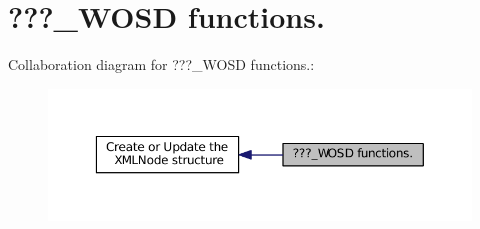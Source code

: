 \hypertarget{group__xmlWOSD}{\section{???\-\_\-\-W\-O\-S\-D functions.}
\label{group__xmlWOSD}
}
Collaboration diagram for ???\-\_\-\-W\-O\-S\-D functions.\-:
\nopagebreak
\begin{figure}[H]
\begin{center}
\leavevmode
\includegraphics[width=350pt]{group__xmlWOSD}
\end{center}
\end{figure}
